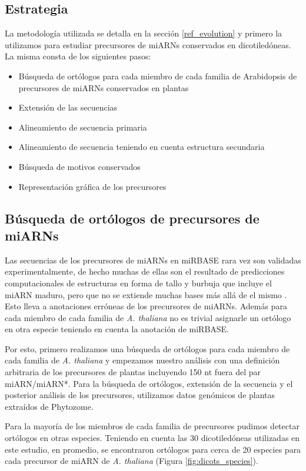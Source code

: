 \subsection{Estrategia}

La metodología utilizada se detalla en la sección \ref{ref_evolution} y primero la utilizamos para estudiar precursores de miARNs conservados en dicotiledóneas. 
La misma consta de los siguientes pasos:

\begin{itemize}
    \item Búsqueda de ortólogos para cada miembro de cada familia de Arabidopsis de  precursores de miARNs conservados en plantas
    \item Extensión de las secuencias
    \item Alineamiento de secuencia primaria
    \item Alineamiento de secuencia teniendo en cuenta estructura secundaria
    \item Búsqueda de motivos conservados
    \item Representación gráfica de los precursores
\end{itemize}

\subsection{Búsqueda de ortólogos de precursores de miARNs}

Las secuencias de los precursores de miARNs en miRBASE rara vez son validadas experimentalmente, de hecho muchas de ellas son el resultado de predicciones computacionales de estructuras en forma de tallo y burbuja que incluye el miARN maduro, pero que no se extiende muchas bases más allá de el mismo \cite{Kozomara2014}.
Esto lleva a anotaciones erróneas de los precursores de miARNs.
Además para cada miembro de cada familia de \textit{A. thaliana} no es trivial asignarle un ortólogo en otra especie teniendo en cuenta la anotación de miRBASE.

Por esto, primero realizamos una búsqueda de ortólogos para cada miembro de cada familia de \textit{A. thaliana} y empezamos nuestro análisis con una definición arbitraria de los precursores de plantas incluyendo 150 nt fuera del par miARN/miARN*.
Para la búsqueda de ortólogos, extensión de la secuencia y el posterior análisis de los precursores, utilizamos datos genómicos de plantas extraídos de Phytozome. 

Para la mayoría de los miembros de cada familia de precursores pudimos detectar ortólogos en otras especies. 
Teniendo en cuenta las 30 dicotiledóneas utilizadas en este estudio, en promedio, se encontraron ortólogos para cerca de 20 especies para cada precursor de miARN de \textit{A. thaliana} (Figura \ref{fig:dicots_species}).

